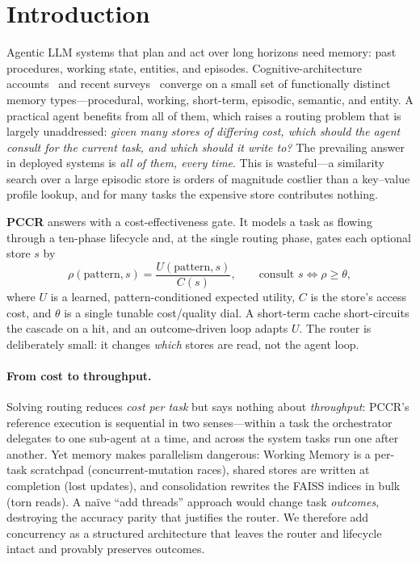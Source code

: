 \documentclass[10pt,twocolumn]{article}
\begin{document}
\section{Introduction}
Agentic LLM systems that plan and act over long horizons need memory: past procedures, working state,
entities, and episodes. Cognitive-architecture accounts~\cite{coala} and recent
surveys~\cite{survey1,survey2} converge on a small set of functionally distinct memory
types---procedural, working, short-term, episodic, semantic, and entity. A practical agent benefits
from all of them, which raises a routing problem that is largely unaddressed: \emph{given many stores
of differing cost, which should the agent consult for the current task, and which should it write to?}
The prevailing answer in deployed systems is \emph{all of them, every time}. This is wasteful---a
similarity search over a large episodic store is orders of magnitude costlier than a key--value profile
lookup, and for many tasks the expensive store contributes nothing.

\textbf{PCCR} answers with a cost-effectiveness gate. It models a task as flowing through a
ten-phase lifecycle and, at the single routing phase, gates each optional store $s$ by
\begin{equation}
\rho(\text{pattern},s)=\frac{U(\text{pattern},s)}{C(s)},\qquad
\text{consult } s \iff \rho\ge\theta,
\label{eq:rho}
\end{equation}
where $U$ is a learned, pattern-conditioned expected utility, $C$ is the store's access cost, and
$\theta$ is a single tunable cost/quality dial. A short-term cache short-circuits the cascade on a
hit, and an outcome-driven loop adapts $U$. The router is deliberately small: it changes \emph{which}
stores are read, not the agent loop.

\paragraph{From cost to throughput.} Solving routing reduces \emph{cost per task} but says nothing
about \emph{throughput}: PCCR's reference execution is sequential in two senses---within a task the
orchestrator delegates to one sub-agent at a time, and across the system tasks run one after another.
Yet memory makes parallelism dangerous: Working Memory is a per-task scratchpad (concurrent-mutation
races), shared stores are written at completion (lost updates), and consolidation rewrites the FAISS
indices in bulk (torn reads). A na\"ive ``add threads'' approach would change task \emph{outcomes},
destroying the accuracy parity that justifies the router. We therefore add concurrency as a structured
architecture that leaves the router and lifecycle intact and provably preserves outcomes.
\end{document}
